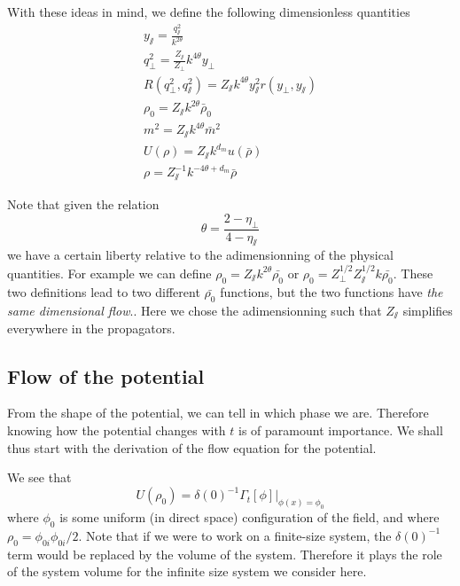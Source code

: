 With these ideas in mind, we define the following dimensionless quantities 
\begin{align}
 y_\sslash = \frac{q_\sslash^2}{k^{2\theta}} \\
q_\perp^2 = \frac{Z_\sslash}{Z_\perp} k^{4\theta} y_\perp \\
R(q_\perp^2,q_\sslash^2) = Z_\sslash k^{4\theta} y_\sslash^2 r(y_\perp, y_\sslash) \\
\rho_0 = Z_\sslash k^{2\theta} \bar \rho_0 \\
m^2 = Z_\sslash k^{4\theta} \bar{m}^2 \\
U(\rho) = Z_\sslash k^{d_m} u(\bar{\rho}) \\
\rho = Z_\sslash^{-1} k^{-4\theta + d_m} \bar{\rho}
\end{align}

Note that given the relation
\begin{equation}
\theta = \frac{2-\eta_\perp}{4-\eta_\sslash}
\end{equation}
we have a certain liberty relative to the adimensionning of the physical quantities. For example we can define $\rho_0 = Z_\sslash k^{2\theta} \bar{\rho_0}$ or $\rho_0 = Z_\perp^{1/2}Z_\sslash^{1/2}k\bar{\rho_0}$. These two definitions lead to two different $\bar{\rho_0}$ functions, but the two functions have \textit{the same dimensional flow}.. Here we chose the adimensionning such that $Z_\sslash$ simplifies everywhere in the propagators. 

\subsection{Flow of the potential}
From the shape of the potential, we can tell in which phase we are. Therefore knowing how the potential changes with $t$ is of paramount importance. We shall thus start with the derivation of the flow equation for the potential.

We see that 
\begin{equation}
U(\rho_0) = \delta(0)^{-1} \Gamma_t[ \phi] |_{\phi(x) = \phi_0}
\end{equation}
where $\phi_0$ is some uniform (in direct space) configuration of the field, and where $\rho_0 = \phi_{0i} \phi_{0i}/2$. Note that if we were to work on a finite-size system, the $\delta(0)^{-1}$ term would be replaced by the volume of the system. Therefore it plays the role of the system volume for the infinite size system we consider here.

